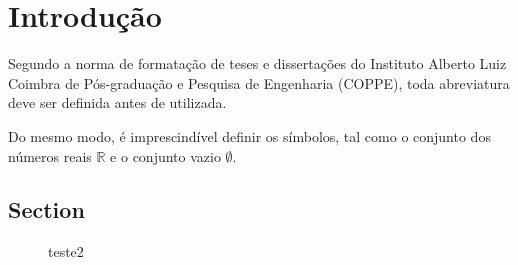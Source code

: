 \chapter{Introdução}

Segundo a norma de formata{\c c}\~ao de teses e disserta{\c c}\~oes do
Instituto Alberto Luiz Coimbra de P\'os-gradua{\c c}\~ao e Pesquisa de
Engenharia (COPPE), toda abreviatura deve ser definida antes de
utilizada.

Do mesmo modo, \'e imprescind\'ivel definir os s\'imbolos, tal como o
conjunto dos n\'umeros reais $\mathbb{R}$ e o conjunto vazio $\emptyset$.



\section{Section}
\label{sec:section}

\begin{figure}[H]
  \centering
  
  \caption{teste2}
  \label{fig:test2}
  \hypertarget{net:1}{}
\end{figure}

